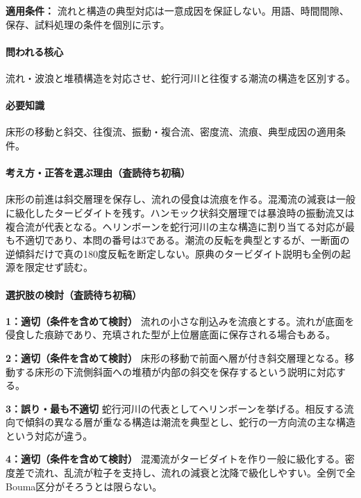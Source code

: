 \noindent\textbf{適用条件：} 流れと構造の典型対応は一意成因を保証しない。用語、時間間隙、保存、試料処理の条件を個別に示す。\par

\paragraph{問われる核心} 流れ・波浪と堆積構造を対応させ、蛇行河川と往復する潮流の構造を区別する。

\paragraph{必要知識} 床形の移動と斜交、往復流、振動・複合流、密度流、流痕、典型成因の適用条件。

\paragraph{考え方・正答を選ぶ理由（査読待ち初稿）} 床形の前進は斜交層理を保存し、流れの侵食は流痕を作る。混濁流の減衰は一般に級化したタービダイトを残す。ハンモック状斜交層理では暴浪時の振動流又は複合流が代表となる。ヘリンボーンを蛇行河川の主な構造に割り当てる対応が最も不適切であり、本問の番号は3である。潮流の反転を典型とするが、一断面の逆傾斜だけで真の180度反転を断定しない。原典のタービダイト説明も全例の起源を限定せず読む。

\paragraph{選択肢の検討（査読待ち初稿）}\mbox{}\par

\noindent\textbf{1：適切（条件を含めて検討）} 流れの小さな削込みを流痕とする。流れが底面を侵食した痕跡であり、充填された型が上位層底面に保存される場合もある。\par

\noindent\textbf{2：適切（条件を含めて検討）} 床形の移動で前面へ層が付き斜交層理となる。移動する床形の下流側斜面への堆積が内部の斜交を保存するという説明に対応する。\par

\noindent\textbf{3：誤り・最も不適切} 蛇行河川の代表としてヘリンボーンを挙げる。相反する流向で傾斜の異なる層が重なる構造は潮流を典型とし、蛇行の一方向流の主な構造という対応が違う。\par

\noindent\textbf{4：適切（条件を含めて検討）} 混濁流がタービダイトを作り一般に級化する。密度差で流れ、乱流が粒子を支持し、流れの減衰と沈降で級化しやすい。全例で全Bouma区分がそろうとは限らない。\par

